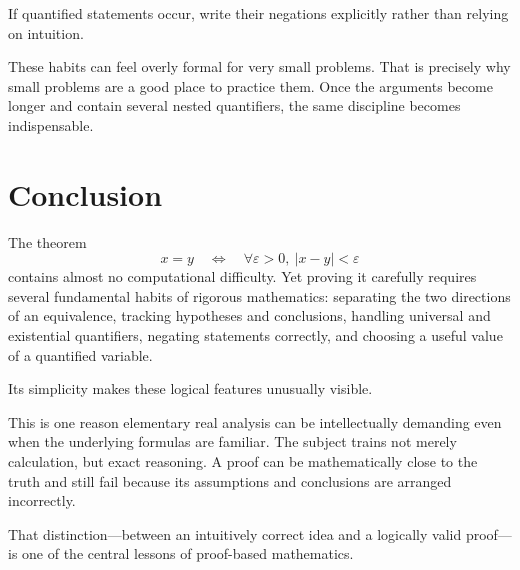 \documentclass{essay}
\begin{document}
If quantified statements occur, write their negations explicitly rather than relying on intuition.

These habits can feel overly formal for very small problems. That is precisely why small problems are a good place to practice them. Once the arguments become longer and contain several nested quantifiers, the same discipline becomes indispensable.

\section{Conclusion}

The theorem
\[ x=y \quad\Longleftrightarrow\quad \forall \varepsilon>0,\ |x-y|<\varepsilon \]
contains almost no computational difficulty. Yet proving it carefully requires several fundamental habits of rigorous mathematics: separating the two directions of an equivalence, tracking hypotheses and conclusions, handling universal and existential quantifiers, negating statements correctly, and choosing a useful value of a quantified variable.

Its simplicity makes these logical features unusually visible.

This is one reason elementary real analysis can be intellectually demanding even when the underlying formulas are familiar. The subject trains not merely calculation, but exact reasoning. A proof can be mathematically close to the truth and still fail because its assumptions and conclusions are arranged incorrectly.

That distinction---between an intuitively correct idea and a logically valid proof---is one of the central lessons of proof-based mathematics.
\end{document}
